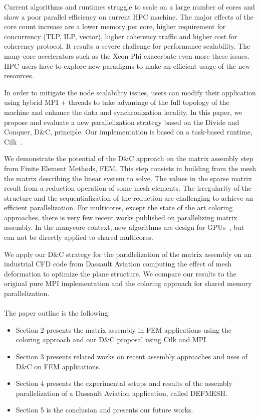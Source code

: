 \documentclass{IOS-Book-Article}
\begin{document}
Current algorithms and runtimes struggle to scale on a large number of cores and show a poor parallel efficiency on current HPC machine. 
The major effects of the core count increase are a lower memory per core, higher requirement for concurrency (TLP, ILP, vector), higher coherency traffic and higher cost for coherency protocol.
It results a severe challenge for performance scalability. The many-core accelerators such as the Xeon Phi exacerbate even more these issues.
HPC users have to explore new paradigms to make an efficient usage of the new resources. 

In order to mitigate the node scalability issues, users can modify their application using hybrid MPI + threads to take advantage of the full topology of the machine and enhance the data and synchronization locality.
In this paper, we propose and evaluate a new parallelization strategy based on the Divide and Conquer, D\&C, principle. Our implementation is based on a task-based runtime, Cilk~\cite{cilk5}. 

We demonstrate the potential of the D\&C approach on the matrix assembly step from Finite Element Methods, FEM.
This step consists in building from the mesh the matrix describing the linear system to solve.
The values in the sparse matrix result from a reduction operation of some mesh elements.
The irregularity of the structure and the sequentialization of the reduction are challenging to achieve an efficient parallelization.
For multicores, except the state of the art coloring approaches, there is very few recent works published on parallelizing matrix assembly.
In the manycore context, new algorithms are design for GPUs~\cite{Stanford,CPUGPUasm}, but can not be directly applied to shared multicores.

We apply our D\&C strategy for the parallelization of the matrix assembly on an industrial CFD code from Dassault Aviation computing the effect of mesh deformation to optimize the plane structure.
We compare our results to the original pure MPI implementation and the coloring approach for shared memory parallelization.
\\\\
The paper outline is the following:
\begin{itemize}
\item Section 2 presents the matrix assembly in FEM applications using the coloring approach and our D\&C proposal using Cilk and MPI.
\item Section 3 presents related works on recent assembly approaches and uses of D\&C on FEM applications.
\item Section 4 presents the experimental setups and results of the assembly parallelization of a Dassault Aviation application, called DEFMESH.
\item Section 5 is the conclusion and presents our future works.
\end{itemize}
\end{document}
